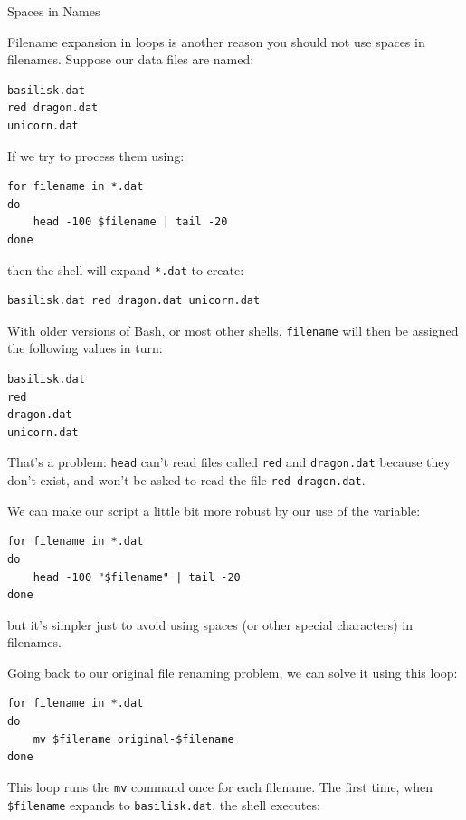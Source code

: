 \documentclass{book}
\begin{document}
\begin{swcbox}{Spaces in Names}

Filename expansion in loops is another reason you should not use spaces
in filenames. Suppose our data files are named:

\begin{verbatim}
basilisk.dat
red dragon.dat
unicorn.dat
\end{verbatim}

If we try to process them using:

\begin{verbatim}
for filename in *.dat
do
    head -100 $filename | tail -20
done
\end{verbatim}

then the shell will expand \texttt{*.dat} to create:

\begin{verbatim}
basilisk.dat red dragon.dat unicorn.dat
\end{verbatim}

With older versions of Bash, or most other shells, \texttt{filename}
will then be assigned the following values in turn:

\begin{verbatim}
basilisk.dat
red
dragon.dat
unicorn.dat
\end{verbatim}

That's a problem: \texttt{head} can't read files called \texttt{red} and
\texttt{dragon.dat} because they don't exist, and won't be asked to read
the file \texttt{red dragon.dat}.

We can make our script a little bit more robust by
 our use of the variable:

\begin{verbatim}
for filename in *.dat
do
    head -100 "$filename" | tail -20
done
\end{verbatim}

but it's simpler just to avoid using spaces (or other special
characters) in filenames.

\end{swcbox}

Going back to our original file renaming problem, we can solve it using
this loop:

\begin{verbatim}
for filename in *.dat
do
    mv $filename original-$filename
done
\end{verbatim}

This loop runs the \texttt{mv} command once for each filename. The first
time, when \texttt{\$filename} expands to \texttt{basilisk.dat}, the
shell executes:
\end{document}
